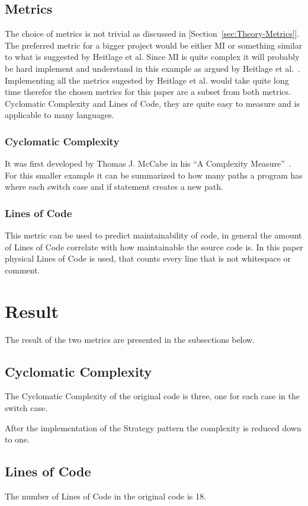 \documentclass[conference, a4paper]{IEEEtran}
\begin{document}
\subsection{Metrics}
The choice of metrics is not trivial as discussed in [Section~\ref{sec:Theory-Metrics}]. The preferred metric for a bigger project would be either MI or something similar to what is suggested by Heitlage et al. Since MI is quite complex it will probably be hard implement and understand in this example as argued by Heitlage et al.~\cite{bibitem:Maintainability}. Implementing all the metrics sugested by Heitlage et al. would take quite long time therefor the chosen metrics for this paper are a subset from both metrics. Cyclomatic Complexity and Lines of Code, they are quite easy to measure and is applicable to many languages.

\subsubsection{Cyclomatic Complexity}
It was first developed by Thomas J. McCabe in his ``A Complexity Measure''~\cite{bibitem:CC}. For this smaller example it can be summarized to how many paths a program has where each switch case and if statement creates a new path.

\subsubsection{Lines of Code}
This metric can be used to predict maintainability of code, in general the amount of Lines of Code correlate with how maintainable the source code is. In this paper physical Lines of Code is used, that counts every line that is not whitespace or comment.

\section{Result}
The result of the two metrics are presented in the subsections below.

\subsection{Cyclomatic Complexity}
The Cyclomatic Complexity of the original code is three, one for each case in the switch case.

After the implementation of the Strategy pattern the complexity is reduced down to one.

\subsection{Lines of Code}
The number of Lines of Code in the original code is 18.
\end{document}
